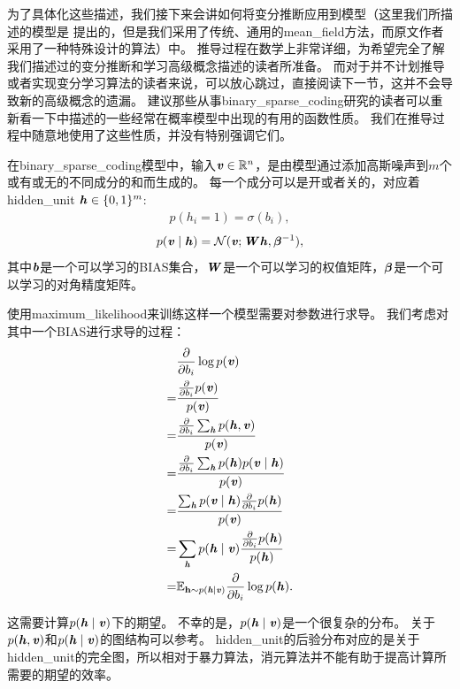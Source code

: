 为了具体化这些描述，我们接下来会讲如何将变分推断应用到模型（这里我们所描述的模型是 \citet{henniges2010binary} 提出的，但是我们采用了传统、通用的\gls{mean_field}方法，而原文作者采用了一种特殊设计的算法）中。
推导过程在数学上非常详细，为希望完全了解我们描述过的变分推断和学习高级概念描述的读者所准备。
而对于并不计划推导或者实现变分学习算法的读者来说，可以放心跳过，直接阅读下一节，这并不会导致新的高级概念的遗漏。
建议那些从事\gls{binary_sparse_coding}研究的读者可以重新看一下中描述的一些经常在概率模型中出现的有用的函数性质。
我们在推导过程中随意地使用了这些性质，并没有特别强调它们。


在\gls{binary_sparse_coding}模型中，输入$\Vv\in\SetR^n$，是由模型通过添加高斯噪声到$m$个或有或无的不同成分的和而生成的。
每一个成分可以是开或者关的，对应着\gls{hidden_unit} $\Vh \in\{0,1\}^m$:
\begin{align}
	p(h_i = 1) = \sigma(b_i),
\end{align}
\begin{align}
	p(\Vv\mid\Vh) = \CalN(\Vv;\MW \Vh,{\Vbeta}^{-1}),
\end{align}
其中$\Vb$是一个可以学习的\gls{BIAS}集合，$\MW$是一个可以学习的权值矩阵，${\Vbeta}$是一个可以学习的对角精度矩阵。


使用\gls{maximum_likelihood}来训练这样一个模型需要对参数进行求导。
我们考虑对其中一个\gls{BIAS}进行求导的过程：
\begin{align}
		& \frac{\partial}{\partial b_i} \log p(\Vv) \\
		= &  \frac{\frac{\partial}{\partial b_i} p(\Vv)}{p(\Vv)}\\
		= & \frac{\frac{\partial}{\partial b_i} \sum_{\Vh}^{} p(\Vh,\Vv)}{p(\Vv)}\\
		= &  \frac{\frac{\partial}{\partial b_i} \sum_{\Vh}^{} p(\Vh) p(\Vv\mid \Vh)  }{p(\Vv)}\\
		= &  \frac{ \sum_{\Vh}^{}  p(\Vv\mid \Vh) \frac{\partial}{\partial b_i} p(\Vh) }{p(\Vv)}\\
		= &  \sum_{\Vh}^{}  p(\Vh\mid \Vv) \frac{  \frac{\partial}{\partial b_i} p(\Vh) }{p(\Vh)}\\
		= & \SetE_{\RVh\sim p(\Vh\mid\Vv)} \frac{\partial}{\partial b_i}\log p(\Vh).
\end{align}


这需要计算$p(\Vh\mid\Vv)$下的期望。
不幸的是，$p(\Vh\mid\Vv)$是一个很复杂的分布。
关于$p(\Vh,\Vv)$和$p(\Vh\mid\Vv)$的图结构可以参考。
\gls{hidden_unit}的后验分布对应的是关于\gls{hidden_unit}的完全图，所以相对于暴力算法，消元算法并不能有助于提高计算所需要的期望的效率。


